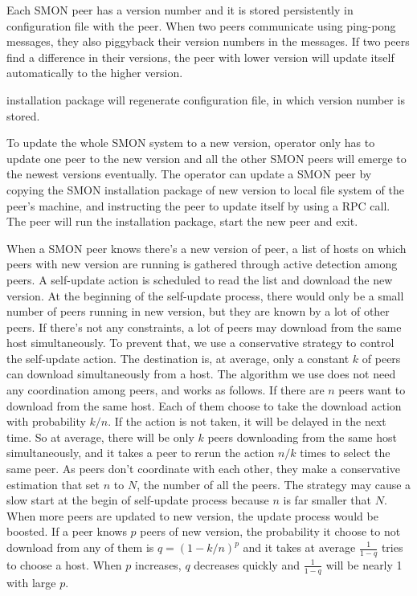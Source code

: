 Each SMON peer has a version number and it is stored
persistently in configuration file with the peer. When two
peers communicate using ping-pong messages, they also
piggyback their version numbers in the messages. If two
peers find a difference in their versions, the peer with
lower version will update itself automatically to the higher
version. 

installation package will regenerate configuration file, in
which version number is stored.

To update the whole SMON system to a new version, operator
only has to update one peer to the new version and all the
other SMON peers will emerge to the newest versions
eventually. The operator can update a SMON peer by copying
the SMON installation package of new version to local file
system of the peer's machine, and instructing the peer to
update itself by using a RPC call. The peer will run the
installation package, start the new peer and exit.

When a SMON peer knows there's a new version of peer, a list of
hosts on which peers with new version are running is gathered
through active detection among peers.  A self-update action is
scheduled to read the list and download the new version. At the
beginning of the self-update process, there would only be a
small number of peers running in new version, but they are known
by a lot of other peers.  If there's not any constraints, a lot
of peers may download from the same host simultaneously. To
prevent that, we use a conservative strategy to control the
self-update action.  The destination is, at average, only a
constant $k$ of peers can download simultaneously from a host.
The algorithm we use does not need any coordination among peers,
and works as follows.  If there are $n$ peers want to download
from the same host. Each of them choose to take the download
action  with probability $k/n$. If the action is not taken, it
will be delayed in the next time. So at average, there will be
only $k$ peers downloading from the same host simultaneously,
and it takes a peer to rerun the action $n/k$ times to select
the same peer.  As peers don't coordinate with each other, they
make a conservative estimation that set $n$ to $N$, the number
of all the peers. The strategy may cause a slow start at the
begin of self-update process because $n$ is far smaller that
$N$. When more peers are updated to new version, the update
process would be boosted. If a peer knows $p$ peers of new
version, the probability it choose to not download from any of
them is $q=(1-k/n)^p$ and it takes at average $\frac{1}{1-q}$
tries to choose a host. When $p$ increases, $q$ decreases
quickly and $\frac{1}{1-q}$ will be nearly 1 with large $p$.

